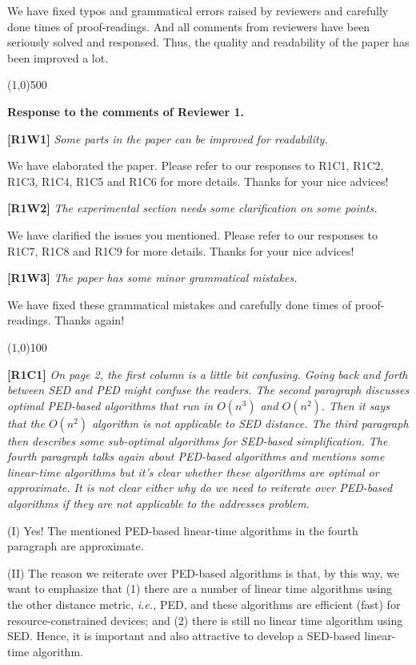 \documentclass{letter}
\newcommand{\ie}{\emph{i.e.,}\xspace}
\begin{document}
We have fixed typos and grammatical errors raised by reviewers and carefully done times of proof-readings. And all comments from reviewers have been seriously solved and responsed. Thus, the quality and readability of the paper has been improved a lot.

\line(1,0){500}

\textbf{Response to the comments of Reviewer 1.}

\textbf{[R1W1]} \emph{Some parts in the paper can be improved for readability.}

We have elaborated the paper. Please refer to our responses to R1C1, R1C2, R1C3, R1C4, R1C5 and R1C6 for more details. Thanks for your nice advices!

\textbf{[R1W2]} \emph{The experimental section needs some clarification on some points.}

We have clarified the issues you mentioned. Please refer to our responses to R1C7, R1C8 and R1C9 for more details. Thanks for your nice advices!

\textbf{[R1W3]} \emph{The paper has some minor grammatical mistakes.}

We have fixed these grammatical mistakes and carefully done times of proof-readings. Thanks again!

\line(1,0){100}

\textbf{[R1C1]} \emph{On page 2, the first column is a little bit confusing. Going back and forth between SED and PED might confuse the readers. The second paragraph discusses optimal PED-based algorithms that run in $O(n^3)$ and $O(n^2)$. Then it says that the $O(n^2)$ algorithm is not applicable to SED distance. The third paragraph then describes some sub-optimal algorithms for SED-based simplification. {The fourth paragraph talks again about PED-based algorithms and mentions some linear-time algorithms but it's clear whether these algorithms are optimal or approximate. It is not clear either why do we need to reiterate over PED-based algorithms if they are not applicable to the addresses problem.}}

(I) Yes! The mentioned PED-based linear-time algorithms in the fourth paragraph are approximate.

(II) The reason we reiterate over PED-based algorithms is that, by this way, we want to emphasize that (1) there are a number of linear time algorithms using the other distance metric, \ie PED, and these algorithms are efficient (fast) for resource-constrained devices; and (2) there is still no linear time algorithm using SED. Hence, it is important and also attractive to develop a SED-based linear-time algorithm.
\end{document}
